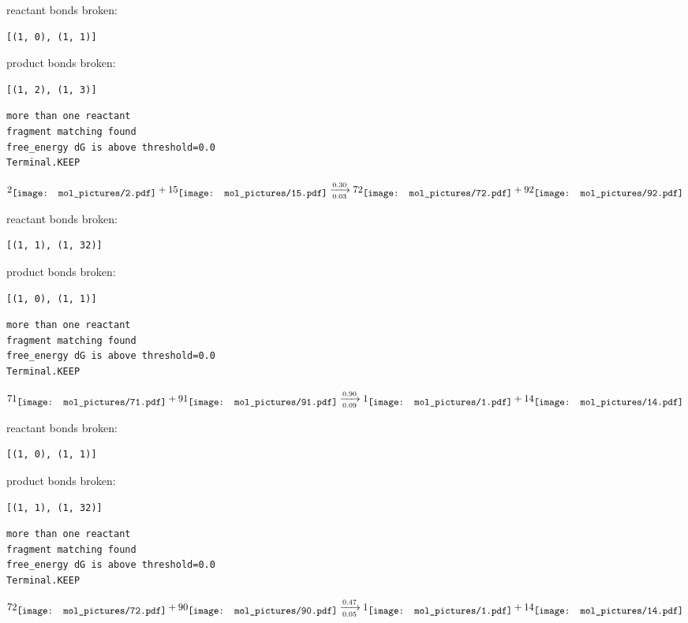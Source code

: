 \documentclass{article}
\begin{document}
reactant bonds broken:\begin{verbatim}
[(1, 0), (1, 1)]
\end{verbatim}
product bonds broken:\begin{verbatim}
[(1, 2), (1, 3)]
\end{verbatim}




\vspace{1cm}
\begin{verbatim}
more than one reactant
fragment matching found
free_energy dG is above threshold=0.0
Terminal.KEEP
\end{verbatim}
$$
2
\raisebox{-.5\height}{\texttt{[image: mol\_pictures/2.pdf]}}
+
15
\raisebox{-.5\height}{\texttt{[image: mol\_pictures/15.pdf]}}
\xrightarrow[0.03]{0.30}
72
\raisebox{-.5\height}{\texttt{[image: mol\_pictures/72.pdf]}}
+
92
\raisebox{-.5\height}{\texttt{[image: mol\_pictures/92.pdf]}}
$$


reactant bonds broken:\begin{verbatim}
[(1, 1), (1, 32)]
\end{verbatim}
product bonds broken:\begin{verbatim}
[(1, 0), (1, 1)]
\end{verbatim}




\vspace{1cm}
\begin{verbatim}
more than one reactant
fragment matching found
free_energy dG is above threshold=0.0
Terminal.KEEP
\end{verbatim}
$$
71
\raisebox{-.5\height}{\texttt{[image: mol\_pictures/71.pdf]}}
+
91
\raisebox{-.5\height}{\texttt{[image: mol\_pictures/91.pdf]}}
\xrightarrow[0.09]{0.90}
1
\raisebox{-.5\height}{\texttt{[image: mol\_pictures/1.pdf]}}
+
14
\raisebox{-.5\height}{\texttt{[image: mol\_pictures/14.pdf]}}
$$


reactant bonds broken:\begin{verbatim}
[(1, 0), (1, 1)]
\end{verbatim}
product bonds broken:\begin{verbatim}
[(1, 1), (1, 32)]
\end{verbatim}




\vspace{1cm}
\begin{verbatim}
more than one reactant
fragment matching found
free_energy dG is above threshold=0.0
Terminal.KEEP
\end{verbatim}
$$
72
\raisebox{-.5\height}{\texttt{[image: mol\_pictures/72.pdf]}}
+
90
\raisebox{-.5\height}{\texttt{[image: mol\_pictures/90.pdf]}}
\xrightarrow[0.05]{0.47}
1
\raisebox{-.5\height}{\texttt{[image: mol\_pictures/1.pdf]}}
+
14
\raisebox{-.5\height}{\texttt{[image: mol\_pictures/14.pdf]}}
$$
\end{document}
